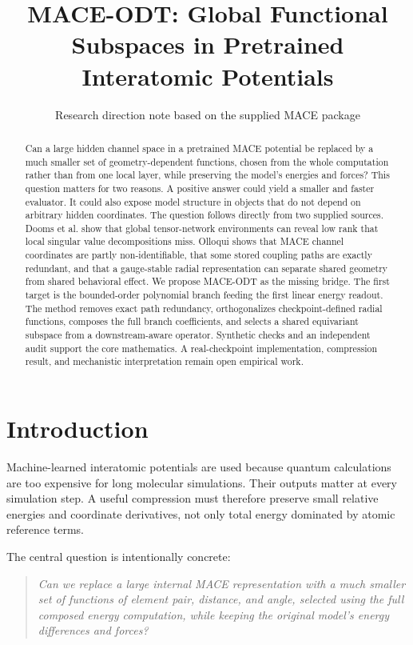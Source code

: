 \documentclass[10pt,twocolumn]{article}
\title{MACE-ODT: Global Functional Subspaces in Pretrained Interatomic Potentials}
\author{Research direction note based on the supplied MACE package}
\date{}
\begin{document}
\maketitle

\begin{abstract}
Can a large hidden channel space in a pretrained MACE potential be replaced by a much smaller set of geometry-dependent functions, chosen from the whole computation rather than from one local layer, while preserving the model's energies and forces? This question matters for two reasons. A positive answer could yield a smaller and faster evaluator. It could also expose model structure in objects that do not depend on arbitrary hidden coordinates. The question follows directly from two supplied sources. Dooms et al. show that global tensor-network environments can reveal low rank that local singular value decompositions miss. Olloqui shows that MACE channel coordinates are partly non-identifiable, that some stored coupling paths are exactly redundant, and that a gauge-stable radial representation can separate shared geometry from shared behavioral effect. We propose MACE-ODT as the missing bridge. The first target is the bounded-order polynomial branch feeding the first linear energy readout. The method removes exact path redundancy, orthogonalizes checkpoint-defined radial functions, composes the full branch coefficients, and selects a shared equivariant subspace from a downstream-aware operator. Synthetic checks and an independent audit support the core mathematics. A real-checkpoint implementation, compression result, and mechanistic interpretation remain open empirical work.
\end{abstract}

\section{Introduction}

Machine-learned interatomic potentials are used because quantum calculations are too expensive for long molecular simulations. Their outputs matter at every simulation step. A useful compression must therefore preserve small relative energies and coordinate derivatives, not only total energy dominated by atomic reference terms.

The central question is intentionally concrete:

\begin{quote}
\itshape
Can we replace a large internal MACE representation with a much smaller set of functions of element pair, distance, and angle, selected using the full composed energy computation, while keeping the original model's energy differences and forces?
\end{quote}
\end{document}
